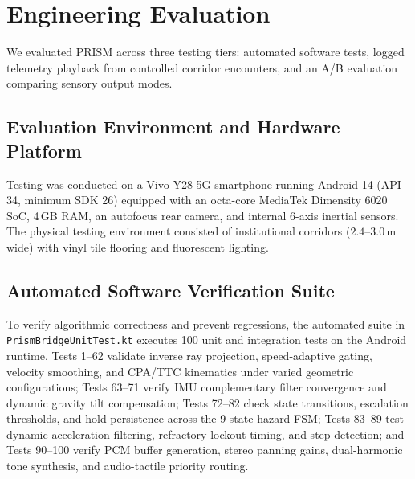 \section{Engineering Evaluation}
\label{sec:evaluation}

We evaluated PRISM across three testing tiers: automated software tests, logged telemetry playback from controlled corridor encounters, and an A/B evaluation comparing sensory output modes.

\subsection{Evaluation Environment and Hardware Platform}
Testing was conducted on a Vivo Y28 5G smartphone running Android 14 (API 34, minimum SDK 26) equipped with an octa-core MediaTek Dimensity 6020 SoC, 4\,GB RAM, an autofocus rear camera, and internal 6-axis inertial sensors. The physical testing environment consisted of institutional corridors ($2.4\text{--}3.0$\,m wide) with vinyl tile flooring and fluorescent lighting.



\subsection{Automated Software Verification Suite}
To verify algorithmic correctness and prevent regressions, the automated suite in \texttt{PrismBridgeUnitTest.kt} executes 100 unit and integration tests on the Android runtime. Tests 1--62 validate inverse ray projection, speed-adaptive gating, velocity smoothing, and CPA/TTC kinematics under varied geometric configurations; Tests 63--71 verify IMU complementary filter convergence and dynamic gravity tilt compensation; Tests 72--82 check state transitions, escalation thresholds, and hold persistence across the 9-state hazard FSM; Tests 83--89 test dynamic acceleration filtering, refractory lockout timing, and step detection; and Tests 90--100 verify PCM buffer generation, stereo panning gains, dual-harmonic tone synthesis, and audio-tactile priority routing.

